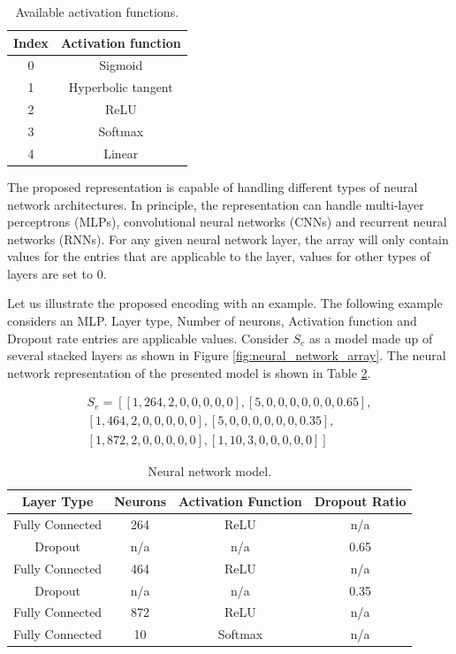 \documentclass[preprint,12pt]{elsarticle}%
\begin{document}
\begin{table}[H]
\begin{center}
\begin{tabular}{| c | c |}
\hline
Index & Activation function \\
\hline
0 & Sigmoid \\
1 & Hyperbolic tangent \\
2 & ReLU \\
3 & Softmax \\
4 & Linear \\
\hline
\end{tabular}
\end{center}
\caption{Available activation functions.}
\label{table:index_to_activation_functions}
\end{table}

The proposed representation is capable of handling different types of neural network architectures. In principle, the representation can handle multi-layer perceptrons (MLPs), convolutional neural networks (CNNs) and recurrent neural networks (RNNs). For any given neural network layer, the array will only contain values for the entries that are applicable to the layer, values for other types of layers are set to 0.

Let us illustrate the proposed encoding with an example. The following example considers an MLP. Layer type, Number of neurons, Activation function and Dropout rate entries are applicable values. Consider $S_e$ as a model made up of several stacked layers as shown in Figure \ref{fig:neural_network_array}.
The neural network representation of the presented model is shown in Table \ref{table:neural_network_model}.

\begin{align*}
S_e = \left[ \left[1, 264, 2, 0, 0, 0, 0, 0 \right], \left[5, 0, 0, 0, 0, 0, 0, 0.65 \right], \right. \\
\left. \left[1, 464, 2, 0, 0, 0, 0, 0 \right], \left[5, 0, 0, 0, 0, 0, 0, 0.35 \right], \right. \\
\left. \left[1, 872, 2, 0, 0, 0, 0, 0 \right], \left[1, 10, 3, 0, 0, 0, 0, 0 \right] \right]
\end{align*}

\begin{table}[H]
\begin{center}
\begin{tabular}{| c | c | c | c |}
\hline
Layer Type & Neurons & Activation Function & Dropout Ratio \\
\hline
Fully Connected & 264 & ReLU & n/a \\
Dropout & n/a & n/a & 0.65 \\
Fully Connected & 464 & ReLU & n/a\\
Dropout & n/a & n/a & 0.35\\
Fully Connected & 872 & ReLU & n/a\\
Fully Connected & 10 & Softmax & n/a\\
\hline
\end{tabular}
\end{center}
\caption{Neural network model.}
\label{table:neural_network_model}
\end{table}
\end{document}

